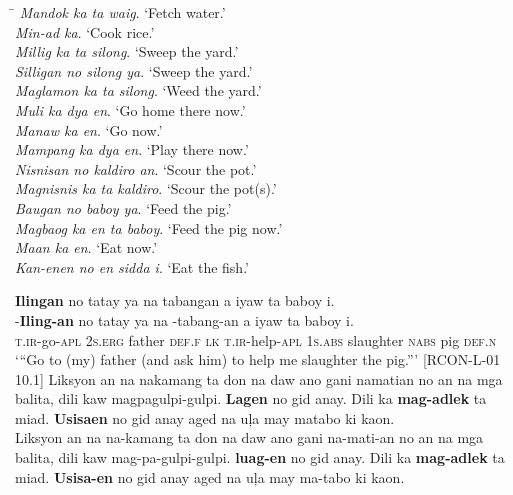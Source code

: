 \ea
\label{bkm:Ref113955378}
\begin{tabbing}
\hspace{4cm} \= \kill
\textit{Mandok ka ta waig}. \> ‘Fetch water.’ \\
\textit{Min-ad ka}. \> ‘Cook rice.’ \\
\textit{Millig ka ta silong}. \> ‘Sweep the yard.’ \\
\textit{Silligan no silong ya}. \>‘Sweep the yard.’ \\
\textit{Maglamon ka ta silong}. \> ‘Weed the yard.’ \\
\textit{Muli ka dya en}. \> ‘Go home there now.’ \\
\textit{Manaw ka en}. \> ‘Go now.’ \\
\textit{Mampang ka dya en}. \> ‘Play there now.’ \\
\textit{Nisnisan no kaldiro an}. \> ‘Scour the pot.’ \\
\textit{Magnisnis ka ta kaldiro}. \> ‘Scour the pot(s).’ \\
\textit{Baugan no baboy ya}. \> ‘Feed the pig.’ \\
\textit{Magbaog ka en ta baboy}. \> ‘Feed the pig now.’ \\
\textit{Maan ka en}. \> ‘Eat now.’ \\
\textit{Kan-enen no en sidda i}. \> ‘Eat the fish.’
\end{tabbing}
\z
\ea
\textbf{Ilingan}  no  tatay  ya  na  tabangan  a  iyaw  ta  baboy  i. \\\smallskip
\gll \emptyset{}-\textbf{Iling-an}  no  tatay  ya  na  \emptyset{}-tabang-an  a  iyaw  ta  baboy  i. \\
\textsc{t.ir}-go-\textsc{apl}  2\textsc{s.erg}  father  \textsc{def.f}  \textsc{lk}  \textsc{t.ir}-help-\textsc{apl}  1\textsc{s.abs}  slaughter  \textsc{nabs}  pig  \textsc{def.n} \\
\glt `“Go to (my) father (and ask him) to help me slaughter the pig.”' [RCON-L-01 10.1]
\z
\ea
Liksyon  an  na  nakamang  ta  don  na  daw  ano gani namatian  no  an  na  mga  balita,  dili  kaw magpagulpi-gulpi.  \textbf{Lagen} no  gid  anay.  Dili  ka \textbf{mag-adlek}  ta  miad.  \textbf{Usisaen}  no  gid  anay  aged na  uļa  may  matabo  ki  kaon. \\\smallskip
\gll Liksyon  an  na  na-kamang  ta  don  na  daw  ano\footnotemark{}  gani na-mati-an  no  an  na  mga  balita,  dili  kaw mag-pa-gulpi-gulpi.  \textbf{luag-en}\footnotemark{}  no  gid  anay.  Dili  ka \textbf{mag-adlek}  ta  miad.  \textbf{Usisa-en}  no  gid  anay  aged na  uļa  may  ma-tabo  ki  kaon. \\
